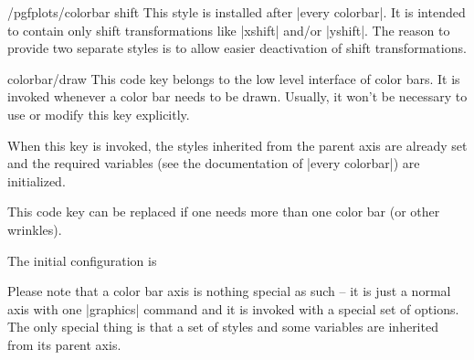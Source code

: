 \begin{stylekey}{/pgfplots/colorbar shift}
    This style is installed after |every colorbar|. It is intended to contain
    only shift transformations like |xshift| and/or |yshift|. The reason to
    provide two separate styles is to allow easier deactivation of shift
    transformations.
\begin{codeexample}
\end{codeexample}
\end{stylekey}


\begin{pgfplotscodekey}{colorbar/draw}
    This code key belongs to the low level interface of color bars. It is
    invoked whenever a color bar needs to be drawn. Usually, it won't be
    necessary to use or modify this key explicitly.

    When this key is invoked, the styles inherited from the parent axis are
    already set and the required variables (see the documentation of
    |every colorbar|) are initialized.

    This code key can be replaced if one needs more than one color bar (or
    other wrinkles).

    The initial configuration is
\begin{codeexample}
\end{codeexample}

    Please note that a color bar axis is nothing special as such -- it is just
    a normal axis with one |\addplot graphics| command and it is invoked with a
    special set of options. The only special thing is that a set of styles and
    some variables are inherited from its parent axis.
\end{pgfplotscodekey}

